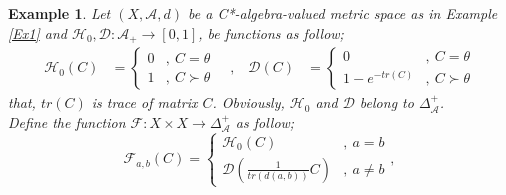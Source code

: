 \documentclass{amsart}%
\theoremstyle{plain}
\newtheorem{example}{Example}
\numberwithin{equation}{section}
\begin{document}
\begin{example}\label{Ex2}
	Let $(X, \mathcal{A}, d)$ be a C*-algebra-valued metric space as in Example \ref{Ex1} and $\mathcal{H}_0 , \mathcal{D}: \mathcal{A}_+ \to [0, 1]$, be functions as follow;\\
	\[
	\begin{aligned}
		\mathcal{H}_0(C) &= 
		\begin{cases}
			0 & ,\  C=\theta \\
			1 & ,\  C \succ \theta 
		\end{cases}
		& \ , \  &
		\mathcal{D}(C) &= 
		\begin{cases}
			0 & ,\  C=\theta \\
			1-e^{-tr(C)} & ,\  C\succ\theta 
		\end{cases}
	\end{aligned}
	\]
	that, $tr(C)$ is {\em trace} of matrix $C$. Obviously, $\mathcal{H}_0$ and $\mathcal{D}$ belong to $\Delta^+_{\mathcal{A}}$.\\ Define the function $\mathcal{F}: X\times X \to \Delta^+_{\mathcal{A}} $ as follow;
	\[
	\mathcal{F}_{a,b}(C) = 
	\begin{cases}
		\mathcal{H}_0(C) & ,\  a=b \\
		\mathcal{D}(\frac{1}{tr\left(d(a,b)\right)}C) & ,\ a\neq b
	\end{cases},
	\]
	

\end{example}
\end{document}
